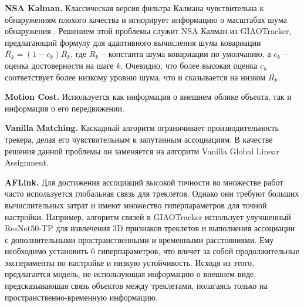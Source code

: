 \vspace{0.2cm}

\textbf{NSA Kalman.} Классическая версия фильтра Калмана чувствительна к обнаружениям плохого качества и игнорирует информацию о масштабах шума обнаружения \cite{7-6}. Решением этой проблемы служит NSA Калман из GIAOTracker, предлагающий формулу для адаптивного вычисления шума ковариации $\bar{R_k}=(1-c_k)R_k$, где $R_k$ -- константа шума ковариации по умолчанию, а $c_k$ -- оценка достоверности на шаге $k$. Очевидно, что более высокая оценка $c_k$ соответствует более низкому уровню шума, что и сказывается на низком $\bar{R_k}$.

\vspace{0.2cm}

\textbf{Motion Cost.} Используется как информация о внешнем облике объекта, так и информация о его передвижении.

\vspace{0.2cm}

\textbf{Vanilla Matching.} Каскадный алгоритм \cite{7-7} ограничивает производительность трекера, делая его чувствительным к запутанным ассоциациям. В качестве решения данной проблемы он заменяется на алгоритм Vanilla Global Linear Assignment.

\vspace{0.2cm}

\textbf{AFLink.} Для достижения ассоциаций высокой точности во множестве работ часто используется глобальная связь для треклетов. Однако они требуют больших вычислительных затрат и имеют множество гиперпараметров для точной настройки. Например, алгоритм связей в GIAOTracker использует улучшенный ResNet50-TP для извлечения 3D признаков треклетов и выполнения ассоциации с дополнительными пространственными и временными расстояниями. Ему необходимо установить 6 гиперпараметров, что влечет за собой продолжительные эксперименты по настройке и низкую устойчивость. Исходя из этого, предлагается модель, не использующая информацию о внешнем виде, предсказывающая связь объектов между треклетами, полагаясь только на пространственно-временную информацию.

